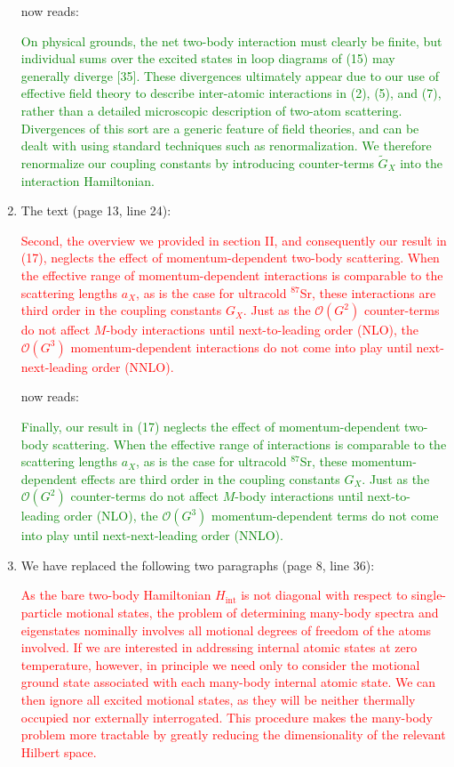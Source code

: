 \documentclass[preprint,showkeys,nofootinbib]{revtex4-1}
\renewcommand{\t}{\text} %
\newcommand{\p}[1]{\left(#1\right)} %
\renewcommand{\O}{\mathcal{O}}
\newcommand{\1}{\mathds{1}}
\newcommand{\red}[1]{\textcolor{red}{#1}}
\newcommand{\green}[1]{\textcolor{green}{#1}}
\newcounter{point}
\newcommand{\step}{\stepcounter{point}\setcounter{enumi}{0}}
\begin{document}
\begin{enumerate}[label=(R1.\arabic{point}.\arabic*)]
  now reads:

  \green{On physical grounds, the net two-body interaction must
    clearly be finite, but individual sums over the excited states in
    loop diagrams of (15) may generally diverge [35].  These
    divergences ultimately appear due to our use of effective field
    theory to describe inter-atomic interactions in (2), (5), and (7),
    rather than a detailed microscopic description of two-atom
    scattering.  Divergences of this sort are a generic feature of
    field theories, and can be dealt with using standard techniques
    such as renormalization.  We therefore renormalize our coupling
    constants by introducing counter-terms $\tilde G_X$ into the
    interaction Hamiltonian.}


\item The text (page 13, line 24):

  \red{Second, the overview we provided in section II, and
    consequently our result in (17), neglects the effect of
    momentum-dependent two-body scattering. When the effective range
    of momentum-dependent interactions is comparable to the scattering
    lengths $a_X$, as is the case for ultracold ${}^{87}$Sr, these
    interactions are third order in the coupling constants $G_X$. Just
    as the $\O\p{G^2}$ counter-terms do not affect $M$-body
    interactions until next-to-leading order (NLO), the $\O\p{G^3}$
    momentum-dependent interactions do not come into play until next-
    next-leading order (NNLO).}

  now reads:

  \green{Finally, our result in (17) neglects the effect of
    momentum-dependent two-body scattering.  When the effective range
    of interactions is comparable to the scattering lengths $a_X$, as
    is the case for ultracold ${}^{87}$Sr, these momentum-dependent
    effects are third order in the coupling constants $G_X$.  Just as
    the $\O\p{G^2}$ counter-terms do not affect $M$-body interactions
    until next-to-leading order (NLO), the $\O\p{G^3}$
    momentum-dependent terms do not come into play until
    next-next-leading order (NNLO).}


  \step
\item We have replaced the following two paragraphs (page 8, line 36):

  \red{As the bare two-body Hamiltonian $H_{\t{int}}$ is not diagonal
    with respect to single-particle motional states, the problem of
    determining many-body spectra and eigenstates nominally involves
    all motional degrees of freedom of the atoms involved.  If we are
    interested in addressing internal atomic states at zero
    temperature, however, in principle we need only to consider the
    motional ground state associated with each many-body internal
    atomic state.  We can then ignore all excited motional states, as
    they will be neither thermally occupied nor externally
    interrogated.  This procedure makes the many-body problem more
    tractable by greatly reducing the dimensionality of the relevant
    Hilbert space.}


\end{enumerate}
\end{document}
